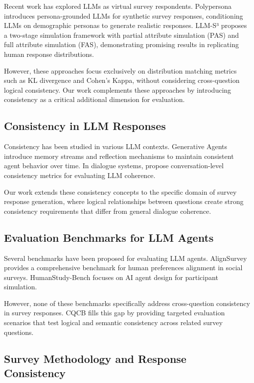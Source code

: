 \documentclass[sigconf, anonymous]{acmart}
\begin{document}
Recent work has explored LLMs as virtual survey respondents. Polypersona \citep{chen2025polypersona} introduces persona-grounded LLMs for synthetic survey responses, conditioning LLMs on demographic personas to generate realistic responses. LLM-S³ \citep{zhang2025llm} proposes a two-stage simulation framework with partial attribute simulation (PAS) and full attribute simulation (FAS), demonstrating promising results in replicating human response distributions.

However, these approaches focus exclusively on distribution matching metrics such as KL divergence and Cohen's Kappa, without considering cross-question logical consistency. Our work complements these approaches by introducing consistency as a critical additional dimension for evaluation.

\subsection{Consistency in LLM Responses}

Consistency has been studied in various LLM contexts. Generative Agents \citep{park2023generative} introduce memory streams and reflection mechanisms to maintain consistent agent behavior over time. In dialogue systems, \citet{abdulhai2025measuring} propose conversation-level consistency metrics for evaluating LLM coherence.

Our work extends these consistency concepts to the specific domain of survey response generation, where logical relationships between questions create strong consistency requirements that differ from general dialogue coherence.

\subsection{Evaluation Benchmarks for LLM Agents}

Several benchmarks have been proposed for evaluating LLM agents. AlignSurvey \citep{liu2025alignsurvey} provides a comprehensive benchmark for human preferences alignment in social surveys. HumanStudy-Bench \citep{zhang2026humanstudy} focuses on AI agent design for participant simulation.

However, none of these benchmarks specifically address cross-question consistency in survey responses. CQCB fills this gap by providing targeted evaluation scenarios that test logical and semantic consistency across related survey questions.

\subsection{Survey Methodology and Response Consistency}
\end{document}
